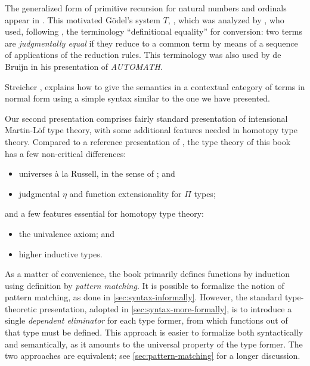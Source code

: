 
The generalized form of primitive recursion for natural numbers and ordinals
appear in \cite{Hilbert-1925}. This motivated G\"odel's system $T$,
\cite{Goedel-T-1958}, which was analyzed by \cite{Tait-1966}, who used,
following \cite{Goedel-T-1958}, the terminology ``definitional equality'' for
conversion: two terms are \emph{judgmentally equal} if they reduce to a
common term by means of a sequence of applications of the reduction
rules. This terminology was also used by de Bruijn \cite{deBruijn-1973} in his
presentation of \emph{AUTOMATH}.

Streicher \cite[Theorem 4.13]{Streicher-1991}, explains how to give the
semantics in a contextual category of terms in normal form using a simple syntax
similar to the one we have presented.

Our second presentation comprises fairly standard presentation of
intensional Martin-L\"{o}f type theory, with some additional features needed in
homotopy type theory. Compared to a reference presentation of
\cite{hofmann:syntax-and-semantics}, the type theory of this book has a few
non-critical differences:
%
\begin{itemize}
\item universes \`{a} la Russell, in the sense of
\cite{martin-lof:bibliopolis}; and
\item judgmental $\eta$ and function extensionality for $\Pi$ types;
\end{itemize}
and a few features essential for homotopy type theory:
\begin{itemize}
\item the univalence axiom; and
\item higher inductive types.
\end{itemize}
%
As a matter of convenience, the book primarily defines functions by induction
using definition by \emph{pattern matching}.
%
%
It is possible to formalize the
notion of pattern matching, as done in \autoref{sec:syntax-informally}. However, the
standard type-theoretic presentation, adopted in \autoref{sec:syntax-more-formally}, is to introduce a single \emph{dependent
eliminator} for each type former, from which functions out of that type must be
defined. This approach is easier to formalize both syntactically and
semantically, as it amounts to the universal property of the type former.
The two approaches are equivalent; see \autoref{sec:pattern-matching} for a
longer discussion.

%
%


